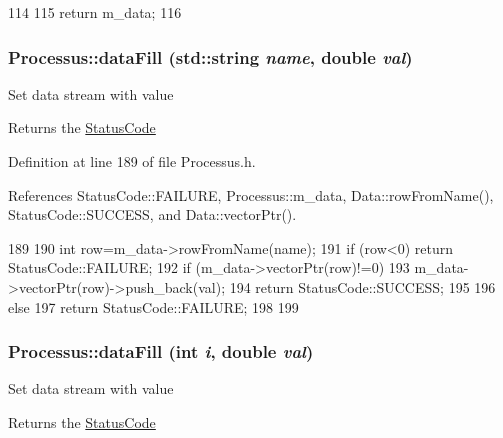 \begin{DoxyCode}
114               {
115     return m_data;
116   }
\end{DoxyCode}
\hypertarget{classProcessus_aa31ab71711f7af6a729441ff573f69c9}{
\subsubsection[{dataFill}]{ Processus::dataFill (std::string {\em name}, \/  double {\em val})}}
\label{classProcessus_aa31ab71711f7af6a729441ff573f69c9}
Set data stream with value \begin{DoxyReturn}{Returns}
the \hyperlink{classStatusCode}{StatusCode} 
\end{DoxyReturn}


Definition at line 189 of file Processus.h.

References StatusCode::FAILURE, Processus::m\_\-data, Data::rowFromName(), StatusCode::SUCCESS, and Data::vectorPtr().


\begin{DoxyCode}
189                                                  {
190     int row=m_data->rowFromName(name);
191     if (row<0) return StatusCode::FAILURE;
192     if (m_data->vectorPtr(row)!=0){
193       m_data->vectorPtr(row)->push_back(val);
194       return StatusCode::SUCCESS;
195     }
196     else {
197       return StatusCode::FAILURE;
198     }
199   }
\end{DoxyCode}
\hypertarget{classProcessus_a0d093b48f3218a088ba030e24372f18c}{
\subsubsection[{dataFill}]{ Processus::dataFill (int {\em i}, \/  double {\em val})}}
\label{classProcessus_a0d093b48f3218a088ba030e24372f18c}
Set data stream with value \begin{DoxyReturn}{Returns}
the \hyperlink{classStatusCode}{StatusCode} 
\end{DoxyReturn}


